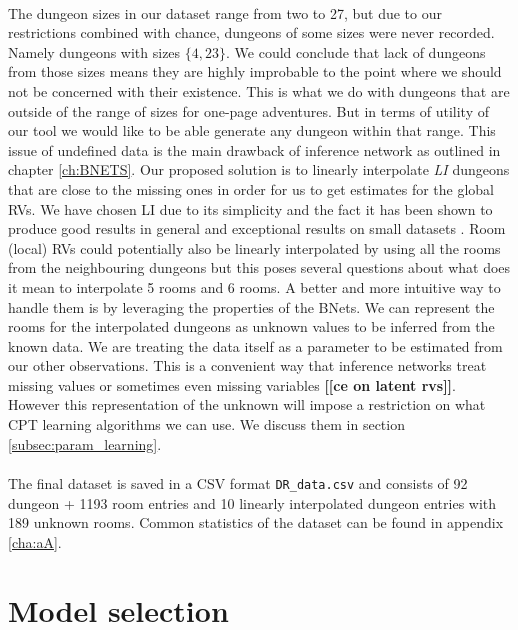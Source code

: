 \documentclass{UoYCSproject}
\begin{document}
\paragraph{}
The dungeon sizes in our dataset range from two to 27, but due to our restrictions combined with chance, dungeons of some sizes were never recorded. Namely dungeons with sizes \(\{4,23\}\). We could conclude that lack of dungeons from those sizes means they are highly improbable to the point where we should not be concerned with their existence. This is what we do with dungeons that are outside of the range of sizes for one-page adventures. But in terms of utility of our tool we would like to be able generate any dungeon within that range. This issue of undefined data is the main drawback of inference network as outlined in chapter \ref{ch:BNETS}. Our proposed solution is to linearly interpolate \textit{LI} dungeons that are close to the missing ones in order for us to get estimates for the global RVs. We have chosen LI due to its simplicity and the fact it has been shown to produce good results in general \parencite{Ibargengoytia2013OnTE} and exceptional results on small datasets \parencite{yu2004advances}. Room (local) RVs could potentially also be linearly interpolated by using all the rooms from the neighbouring dungeons but this poses several questions about what does it mean to interpolate 5 rooms and 6 rooms. A better and more intuitive way to handle them is by leveraging the properties of the BNets. We can represent the rooms for the interpolated dungeons as unknown values to be inferred from the known data. We are treating the data itself as a parameter to be estimated from our other observations. This is a convenient way that inference networks treat missing values or sometimes even missing variables \textbf{[[ce on latent rvs]]}. However this representation of the unknown will impose a restriction on what CPT learning algorithms we can use. We discuss them in section \ref{subsec:param_learning}.

\paragraph{}
The final dataset is saved in a CSV format \texttt{DR\_data.csv} and consists of 92 dungeon + 1193 room entries and 10 linearly interpolated dungeon entries with 189 unknown rooms. Common statistics of the dataset can be found in appendix \ref{cha:aA}.

\section{Model selection} %
\label{sec:model_selection}
\end{document}
